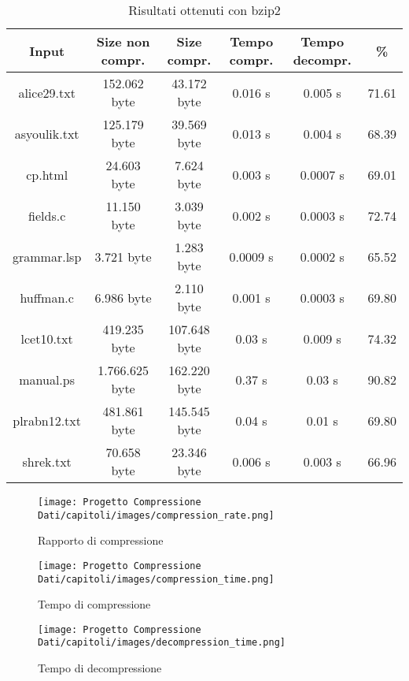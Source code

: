 \begin{table}
    \begin{tabular}{||c c c c c c||} 
     \hline
     Input & Size non compr. & Size compr. & Tempo compr. & Tempo decompr. & \% \\ [0.5ex] 
     \hline\hline
     alice29.txt & 152.062 byte & 43.172 byte & 0.016 s & 0.005 s & 71.61\\ [1ex]
     \hline
     asyoulik.txt & 125.179 byte & 39.569 byte & 0.013 s & 0.004 s & 68.39\\ [1ex] 
     \hline
     cp.html & 24.603 byte & 7.624 byte & 0.003 s & 0.0007 s & 69.01\\ [1ex] 
     \hline
     fields.c & 11.150 byte & 3.039 byte & 0.002 s & 0.0003 s & 72.74\\ [1ex]
     \hline
     grammar.lsp & 3.721 byte & 1.283 byte & 0.0009 s & 0.0002 s & 65.52\\ [1ex] 
     \hline
     huffman.c & 6.986 byte & 2.110 byte & 0.001 s & 0.0003 s & 69.80\\ [1ex]
     \hline
     lcet10.txt & 419.235 byte & 107.648 byte & 0.03 s & 0.009 s & 74.32\\ [1ex] 
     \hline
     manual.ps & 1.766.625 byte & 162.220 byte & 0.37 s & 0.03 s & 90.82\\ 
 [1ex]
     \hline
     plrabn12.txt & 481.861 byte & 145.545 byte & 0.04 s & 0.01 s & 69.80\\ [1ex] 
     \hline
     shrek.txt & 70.658 byte & 23.346 byte & 0.006 s & 0.003 s & 66.96\\ [1ex]

     \hline
    \end{tabular} 
    \caption{Risultati ottenuti con bzip2\label{tab:bzip2}}
    \end{table}
\begin{figure}[h]
    \centering
    \texttt{[image: Progetto Compressione Dati/capitoli/images/compression\_rate.png]}
\caption{Rapporto di compressione}
    \label{fig:ist1}
\end{figure} 
\begin{figure}[h]
    \centering
    \texttt{[image: Progetto Compressione Dati/capitoli/images/compression\_time.png]}
\caption{Tempo di compressione}
    \label{fig:ist2}
\end{figure} 
\begin{figure}[h]
    \centering
    \texttt{[image: Progetto Compressione Dati/capitoli/images/decompression\_time.png]}
\caption{Tempo di decompressione}
    \label{fig:ist3}
\end{figure} 